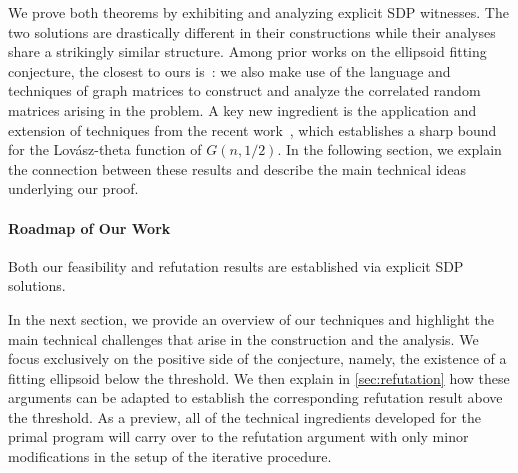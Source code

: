 \documentclass[12pt]{article}
\newcommand{\Lovasz}{Lov\'asz\xspace}
\begin{document}
We prove both theorems by exhibiting and analyzing explicit SDP witnesses. The two solutions are drastically different in their constructions while their analyses share a strikingly similar structure.  Among prior works on the ellipsoid fitting conjecture, the closest to ours is~\cite{HKPX23}: we also make use of the language and techniques of graph matrices to construct and analyze the correlated random matrices arising in the problem. A key new ingredient is the application and extension of techniques from the recent work~\cite{PotechinXu2026Theta}, which establishes a sharp bound for the \Lovasz-theta function of \(G(n,1/2)\). In the following section, we explain the connection between these results and describe the main technical ideas underlying our proof.

\paragraph{Roadmap of Our Work}

%
%
%

Both our feasibility and refutation results are established via explicit SDP solutions.

In the next section, we provide an overview of our techniques and highlight the main technical challenges that arise in the construction and the analysis. We focus exclusively on the positive side of the conjecture, namely, the existence of a fitting ellipsoid below the threshold. We then explain in \cref{sec:refutation} how these arguments can be adapted to establish the corresponding refutation result above the threshold.  As a preview, all of the technical ingredients developed for the primal program will carry over to the refutation argument with only minor modifications in the setup of the iterative procedure. 
\end{document}
